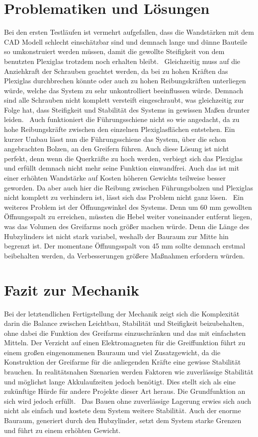 \section{Problematiken und Lösungen}
Bei den ersten Testläufen ist vermehrt aufgefallen, dass die Wandstärken mit dem CAD Modell schlecht einschätzbar sind und demnach lange und dünne Bauteile so umkonstruiert werden müssen, damit die gewollte Steifigkeit von dem benutzten Plexiglas trotzdem noch erhalten bleibt.
\
Gleichzeitig muss auf die Anziehkraft der Schrauben geachtet werden, da bei zu hohen Kräften das Plexiglas durchbrechen könnte oder auch zu hohen Reibungskräften unterliegen würde, welche das System zu sehr unkontrolliert beeinflussen würde. Demnach sind alle Schrauben nicht komplett versteift eingeschraubt, was gleichzeitig zur Folge hat, dass Steifigkeit und Stabilität des Systems in gewissen Maßen drunter leiden. 
\
Auch funktioniert die Führungsschiene nicht so wie angedacht, da zu hohe Reibungskräfte zwischen den einzelnen Plexiglasflächen entstehen. Ein kurzer Umbau lässt nun die Führungsschiene das System, über die schon angebrachten Bolzen, an den Greifern führen. Auch diese Lösung ist nicht perfekt, denn wenn die Querkräfte zu hoch werden, verbiegt sich das Plexiglas und erfüllt demnach nicht mehr seine Funktion einwandfrei. Auch das ist mit einer erhöhten Wandstärke auf Kosten höheren Gewichts teilweise besser geworden. Da aber auch hier die Reibung zwischen Führungsbolzen und Plexiglas nicht komplett zu verhindern ist, lässt sich das Problem nicht ganz lösen.
\
Ein weiteres Problem ist der Öffnungswinkel des Systems. Denn um 60 mm gewollten Öffnungsspalt zu erreichen, müssten die Hebel weiter voneinander entfernt liegen, was das Volumen des Greifarms noch größer machen würde. Denn die Länge des Hubzylinders ist nicht stark variabel, weshalb der Bauraum zur Mitte hin begrenzt ist. Der momentane Öffnungsspalt von 45 mm sollte demnach erstmal beibehalten werden, da Verbesserungen größere Maßnahmen erfordern würden.

\section{Fazit zur Mechanik}

Bei der letztendlichen Fertigstellung der Mechanik zeigt sich die Komplexität darin die Balance zwischen Leichtbau, Stabilität und Steifigkeit beizubehalten, ohne dabei die Funktion des Greifarms einzuschränken und das mit einfachsten Mitteln. Der Verzicht auf einen Elektromagneten für die Greiffunktion führt zu einem großen eingenommenen Bauraum und viel Zusatzgewicht, da die Konstruktion der Greifarme für die anliegenden Kräfte eine gewisse Stabilität brauchen. In realitätsnahen Szenarien werden Faktoren wie zuverlässige Stabilität und möglichst lange Akkulaufzeiten jedoch benötigt. Dies stellt sich als eine zukünftige Hürde für andere Projekte dieser Art heraus. Die Grundfunktion an sich wird jedoch erfüllt.
\
Das Bauen ohne zuverlässige Lagerung erwies sich auch nicht als einfach und kostete dem System weitere Stabilität. Auch der enorme Bauraum, generiert durch den Hubzylinder, setzt dem System starke Grenzen und führt zu einem erhöhten Gewicht.
